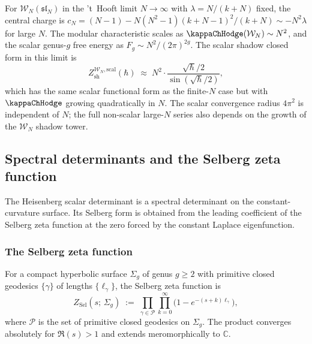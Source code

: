 \begin{remark}
For $\mathcal{W}_N(\mathfrak{sl}_N)$ in the 't~Hooft limit $N \to \infty$ with $\lambda = N/(k+N)$ fixed, the central charge is $c_N = (N-1) - N(N^2-1)(k+N-1)^2/(k+N) \sim -N^2\lambda$ for large $N$. The modular characteristic scales as $\kappaChHodge(\mathcal W_N) \sim N^2$, and the scalar genus-$g$ free energy as $F_g \sim N^2/(2\pi)^{2g}$. The scalar shadow closed form in this limit is
\[
Z_{\mathrm{sh}}^{\mathcal{W}_N,\mathrm{scal}}(\hbar) \;\approx\; N^2 \cdot \frac{\sqrt{\hbar}/2}{\sin(\sqrt{\hbar}/2)},
\]
which has the same scalar functional form as the finite-$N$ case but
with $\kappaChHodge$ growing quadratically in $N$. The scalar convergence
radius $4\pi^2$ is independent of $N$; the full non-scalar large-$N$
series also depends on the growth of the $\mathcal W_N$ shadow tower.
\end{remark}



\subsection{Spectral determinants and the Selberg zeta function}

The Heisenberg scalar determinant is a spectral determinant on the
constant-curvature surface. Its Selberg form is obtained from the
leading coefficient of the Selberg zeta function at the zero forced by
the constant Laplace eigenfunction.

\subsubsection{The Selberg zeta function}

\begin{definition}
For a compact hyperbolic surface $\Sigma_g$ of genus $g \geq 2$ with primitive closed geodesics $\{\gamma\}$ of lengths $\{\ell_\gamma\}$, the Selberg zeta function is
\begin{equation}%
Z_{\mathrm{Sel}}(s;\,\Sigma_g) \;:=\; \prod_{\gamma \in \mathcal{P}} \prod_{k=0}^{\infty} \bigl(1 - e^{-(s+k)\ell_\gamma}\bigr),
\end{equation}
where $\mathcal{P}$ is the set of primitive closed geodesics on $\Sigma_g$. The product converges absolutely for $\Re(s) > 1$ and extends meromorphically to $\mathbb{C}$.
\end{definition}

